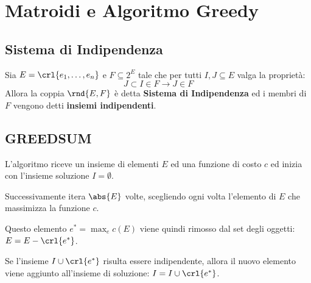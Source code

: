 \documentclass[\main/main.tex]{subfiles}
\begin{document}
\chapter{Matroidi e Algoritmo Greedy}
\section{Sistema di Indipendenza}
\begin{definition}
  Sia \(E = \crl{e_1, \ldots, e_n}\) e \(F \subseteq 2^E\) tale che per tutti \(I, J \subseteq E\) valga la proprietà:
  \[
    J \subset I \in F \rightarrow J \in F
  \]
  Allora la coppia \(\rnd{E, F}\) è detta \textbf{Sistema di Indipendenza} ed i membri di \(F\) vengono detti \textbf{insiemi indipendenti}.
\end{definition}
\section{GREEDSUM}
L'algoritmo riceve un insieme di elementi \(E\) ed una funzione di costo \(c\) ed inizia con l'insieme soluzione \(I = \emptyset \).

Successivamente itera \(\abs{E}\) volte, scegliendo ogni volta l'elemento di \(E\) che massimizza la funzione \(c\).

Questo elemento \(e^* = \max_e c(E)\) viene quindi rimosso dal set degli oggetti: \(E = E - \crl{e^*}\).

Se l'insieme \(I \cup \crl{e^*}\) risulta essere indipendente, allora il nuovo elemento viene aggiunto all'insieme di soluzione: \(I = I \cup \crl{e^*}\).
\end{document}
